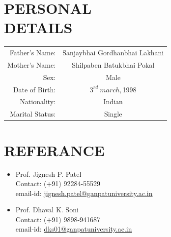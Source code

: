 \documentclass[margin]{res}
\begin{document}
    \section{PERSONAL \\ DETAILS}
    \begin{tabular}{r c}       
        Father's Name: & Sanjaybhai Gordhanbhai Lakhani\\
        Mother's Name: & Shilpaben Batukbhai Pokal\\
        Sex: & Male\\
        Date of Birth: & $3^{rd} \ march, $1998\\
        Nationality: & Indian \\
        Marital Status: & Single \\
    \end{tabular}

    \section{REFERANCE}
\begin{itemize}
    \item Prof. Jignesh P. Patel\\ 
        Contact: (+91) 92284-55529\\
        email-id: \href{jignesh.patel@ganpatuniversity.ac.in}{jignesh.patel@ganpatuniversity.ac.in}\\
    \item Prof. Dhaval K. Soni\\ 
        Contact: (+91) 9898-941687\\
        email-id: \href{dks01@ganpatuniversity.ac.in}{dks01@ganpatuniversity.ac.in}
\end{itemize}
    
\(\)
\end{document}
